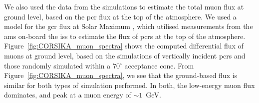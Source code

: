 We also used the data from the simulations to estimate the total muon flux at ground level, based on the \gls{pcr} flux at the top of the atmosphere. We used a model for the \gls{gcr} flux at Solar Maximum \citep{corti_numerical_2019}, which utilised measurements from the \gls{ams} on-board the \gls{iss} to estimate the flux of \glspl{pcr} at the top of the atmosphere. Figure~\ref{fig:CORSIKA_muon_spectra} shows the computed differential flux of muons at ground level, based on the simulations of vertically incident \glspl{pcr} and those randomly simulated within a 70$^\circ$ acceptance cone. From Figure~\ref{fig:CORSIKA_muon_spectra}, we see that the ground-based flux is similar for both types of simulation performed. In both, the low-energy muon flux dominates, and peak at a muon energy of $\sim 1$~GeV.


